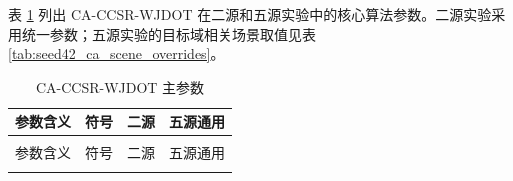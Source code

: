 \documentclass{seuthesis-2022}
\begin{document}
表 \ref{tab:seed42_ca_ccsr_params} 列出 CA-CCSR-WJDOT 在二源和五源实验中的核心算法参数。二源实验采用统一参数；五源实验的目标域相关场景取值见表 \ref{tab:seed42_ca_scene_overrides}。

{
\setlength{\tabcolsep}{3.5pt}
\renewcommand{\arraystretch}{1.16}
\begin{longtable}{@{}>{\raggedright\arraybackslash}p{}>{\raggedright\arraybackslash}p{}>{\raggedright\arraybackslash}p{}>{\raggedright\arraybackslash}p{}@{}}
    \caption{CA-CCSR-WJDOT 主参数}
    \label{tab:seed42_ca_ccsr_params}\\
    \toprule
    参数含义 & 符号 & 二源 & 五源通用 \\
    \midrule
    \endfirsthead
    \multicolumn{4}{r}{续表~\thetable}\\
    \toprule
    参数含义 & 符号 & 二源 & 五源通用 \\
    \midrule
    \endhead
    \bottomrule
    \endfoot
    \bottomrule
    \endlastfoot


\end{longtable}}
\end{document}
